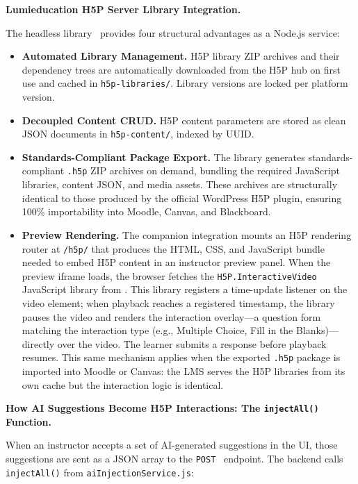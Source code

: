 \textbf{Lumieducation H5P Server Library Integration.}

The headless  library~\cite{lumieducation2023} provides four structural advantages as a Node.js service:

\begin{itemize}
  \item \textbf{Automated Library Management.} H5P library ZIP archives and their dependency trees are automatically downloaded from the H5P hub on first use and cached in \texttt{h5p-libraries/}. Library versions are locked per platform version.
  \item \textbf{Decoupled Content CRUD.} H5P content parameters are stored as clean JSON documents in \texttt{h5p-content/}, indexed by UUID.
  \item \textbf{Standards-Compliant Package Export.} The library generates standards-compliant \texttt{.h5p} ZIP archives on demand, bundling the required JavaScript libraries, content JSON, and media assets. These archives are structurally identical to those produced by the official WordPress H5P plugin, ensuring 100\% importability into Moodle, Canvas, and Blackboard.
  \item \textbf{Preview Rendering.} The companion  integration mounts an H5P rendering router at \texttt{/h5p/} that produces the HTML, CSS, and JavaScript bundle needed to embed H5P content in an instructor preview panel. When the preview iframe loads, the browser fetches the \texttt{H5P.InteractiveVideo} JavaScript library from . This library registers a time-update listener on the video element; when playback reaches a registered timestamp, the library pauses the video and renders the interaction overlay---a question form matching the interaction type (e.g., Multiple Choice, Fill in the Blanks)---directly over the video. The learner submits a response before playback resumes. This same mechanism applies when the exported \texttt{.h5p} package is imported into Moodle or Canvas: the LMS serves the H5P libraries from its own cache but the interaction logic is identical.
\end{itemize}

\textbf{How AI Suggestions Become H5P Interactions: The \texttt{injectAll()} Function.}

When an instructor accepts a set of AI-generated suggestions in the UI, those suggestions are sent as a JSON array to the \texttt{POST}~ endpoint. The backend calls \texttt{injectAll()} from \texttt{aiInjectionService.js}:
\clearpage

